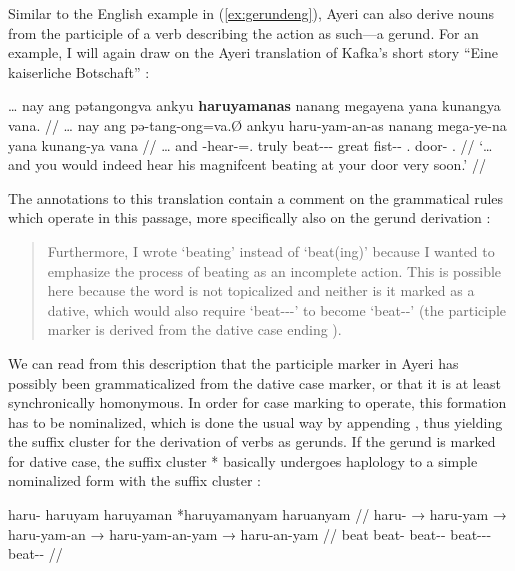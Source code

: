 Similar to the English example in (\ref{ex:gerundeng}), Ayeri can also derive
nouns from the participle of a verb describing the action as such---a gerund.
For an example, I will again draw on the Ayeri translation of Kafka's short
story \enquote{Eine kaiserliche Botschaft} \citep[2,
14]{becker:kafka:imperial}:

\ex\label{ex:kafkagerund}\begingl
	\gla … nay ang pətangongva ankyu \textbf{haruyamanas} nanang megayena 
		yana kunangya vana. //
	\glb … nay ang pə-tang-ong=va.Ø ankyu haru-yam-an-as nanang 
		mega-ye-na yana kunang-ya vana //
	\glc … and \AgtT{} \NFut{}-hear-\Irr{}=\Ssg{}.\Top{} truly 
		beat-\Ptcp{}-\Nmlz{}-\Parg{} great fist-\Pl{}-\Gen{} 
		\TsgM{}.\Gen{} door-\Loc{} \Ssg{}.\Gen{} //
	\glft `… and you would indeed hear his magnifcent beating at your door 
		very soon.' //
\endgl\xe

The annotations to this translation contain a comment on the grammatical 
rules which operate in this passage, more specifically also on the gerund 
derivation :

\blockcquote[14--15]{becker:kafka:imperial}{Furthermore, I wrote
 `beating' instead of  `beat(ing)' because I wanted to
emphasize the process of beating as an incomplete action. This is possible here
because the word is not topicalized and neither is it marked as a dative, which
would also require  `beat-\Ptcp{}-\Nmlz{}-\Dat{}' to become
 `beat-\Nmlz{}-\Dat{}' (the participle marker  is 
derived from the dative case ending ).}

We can read from this description that the participle marker in Ayeri has
possibly been grammaticalized from the dative case marker, or that it is at
least synchronically homonymous. In order for case marking to operate, this
formation has to be nominalized, which is done the usual way by appending
, thus yielding the suffix cluster  for the
derivation of verbs as gerunds. If the gerund is marked for dative case, the
suffix cluster * basically undergoes haplology to a
simple nominalized form with the suffix cluster :

\ex\begingl
	\gla haru- {} haruyam {} haruyaman {} *haruyamanyam {} haruanyam //
	\glb haru- → haru-yam → haru-yam-an → haru-yam-an-yam → 
		haru-an-yam //
	\glc beat {} beat-\Ptcp{} {} beat-\Ptcp{}-\Nmlz{} {} 
		beat-\Ptcp{}-\Nmlz{}-\Dat{} {} beat-\Nmlz{}-\Dat{} //
\endgl\xe


